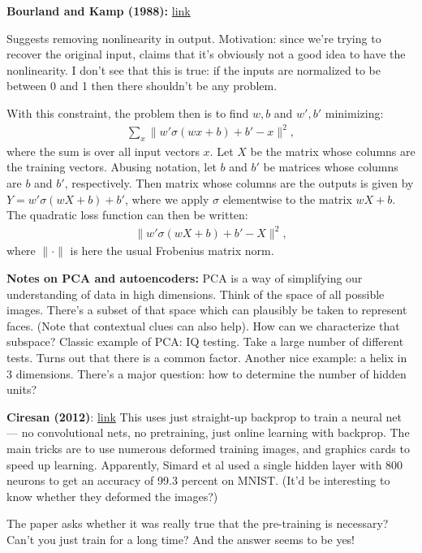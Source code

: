 \documentclass[12pt]{article}
\newcommand{\link}[2]{\href{#1}{#2}}
\begin{document}
\textbf{Bourland and Kamp (1988):}
\link{http://scholar.google.com/scholar?cluster=17784424506773259343\&hl=en\&as\_sdt=0,5}{link}

Suggests removing nonlinearity in output.  Motivation: since we're
trying to recover the original input, claims that it's obviously not a
good idea to have the nonlinearity.  I don't see that this is true: if
the inputs are normalized to be between 0 and 1 then there shouldn't
be any problem.

With this constraint, the problem then is to find $w, b$ and $w', b'$
minimizing:
\begin{eqnarray}
  \sum_x \|w' \sigma(wx+b)+b'-x\|^2,
\end{eqnarray}
where the sum is over all input vectors $x$.  Let $X$ be the matrix
whose columns are the training vectors.  Abusing notation, let $b$ and
$b'$ be matrices whose columns are $b$ and $b'$, respectively.  Then
matrix whose columns are the outputs is given by $Y =
w'\sigma(wX+b)+b'$, where we apply $\sigma$ elementwise to the
matrix $wX+b$.  The quadratic loss function can then be written:
\begin{eqnarray}
  \| w'\sigma(wX+b)+b'-X\|^2,
\end{eqnarray}
where $\|\cdot\|$ is here the usual Frobenius matrix norm.

\textbf{Notes on PCA and autoencoders:} PCA is a way of simplifying
our understanding of data in high dimensions.  Think of the space of
all possible images.  There's a subset of that space which can
plausibly be taken to represent faces.  (Note that contextual clues
can also help).  How can we characterize that subspace?  Classic
example of PCA: IQ testing.  Take a large number of different tests.
Turns out that there is a common factor.  Another nice example: a
helix in 3 dimensions.  There's a major question: how to determine the
number of hidden units?

\textbf{Ciresan (2012)}: \link{http://arxiv.org/abs/1003.0358}{link}
This uses just straight-up backprop to train a neural net --- no
convolutional nets, no pretraining, just online learning with
backprop.  The main tricks are to use numerous deformed training
images, and graphics cards to speed up learning.  Apparently, Simard
et al used a single hidden layer with 800 neurons to get an accuracy
of 99.3 percent on MNIST.  (It'd be interesting to know whether they
deformed the images?)

The paper asks whether it was really true that the pre-training is
necessary?  Can't you just train for a long time?  And the answer
seems to be yes!
\end{document}
